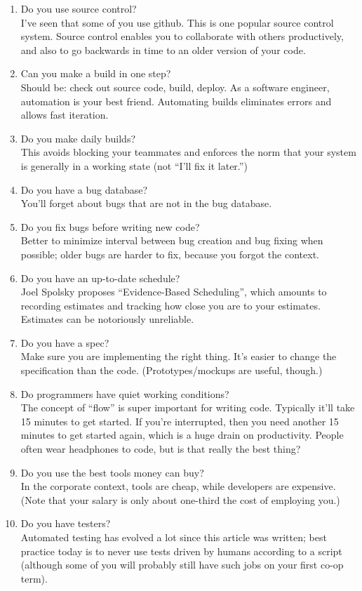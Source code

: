 \documentclass[11pt]{article}
\begin{document}
\begin{enumerate}
\item Do you use source control?\\
  I've seen that some of you use github. This is one popular source control system.
  Source control enables you to collaborate with others productively, and also to
  go backwards in time to an older version of your code.
\item Can you make a build in one step?\\
  Should be: check out source code, build, deploy. As a software engineer, automation
  is your best friend. Automating builds eliminates errors and allows fast iteration.
\item Do you make daily builds?\\
  This avoids blocking your teammates and enforces the norm that your system is generally in a working state (not ``I'll fix it later.'')
\item Do you have a bug database?\\
  You'll forget about bugs that are not in the bug database.
\item Do you fix bugs before writing new code?\\
  Better to minimize interval between bug creation and bug fixing when possible; older bugs are
  harder to fix, because you forgot the context.
\item Do you have an up-to-date schedule?\\
  Joel Spolsky proposes ``Evidence-Based Scheduling'', which amounts to recording estimates and tracking how close you are to your estimates. Estimates can be notoriously unreliable.
\item Do you have a spec?\\
  Make sure you are implementing the right thing. It's easier to change the specification than the code. (Prototypes/mockups are useful, though.)
\item Do programmers have quiet working conditions?\\
  The concept of ``flow'' is super important for writing code. Typically it'll take 15 minutes to get started. If you're interrupted, then you need another 15 minutes to get started again, which is a huge drain on productivity. People often wear headphones to code, but is that really the best thing?
\item Do you use the best tools money can buy?\\
  In the corporate context, tools are cheap, while developers are expensive. (Note that your salary is only about one-third the cost of employing you.)
\item Do you have testers?\\
  Automated testing has evolved a lot since this article was written; best practice today is to never use tests driven by humans according to a script (although some of you will probably still have such jobs on your first co-op term).


\end{enumerate}
\end{document}
